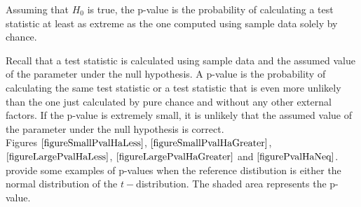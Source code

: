 \begin{definition}[P-value]\label{definitionPValue}	
Assuming that $H_{0}$ is true, the p-value is the probability of calculating a test statistic at least as extreme as the one computed using sample data solely by chance.
\end{definition}

Recall that a test statistic is calculated using sample data and the assumed value of the parameter under the null hypothesis. A p-value is the probability of calculating the same test statistic or a test statistic that is even more unlikely than the one just calculated by pure chance and without any other external factors. If the p-value is extremely small, it is unlikely that the assumed value of the parameter under the null hypothesis is correct.\\

Figures $\ref{figureSmallPvalHaLess}$,
$\ref{figureSmallPvalHaGreater}$,
$\ref{figureLargePvalHaLess}$,
$\ref{figureLargePvalHaGreater}$
and
$\ref{figurePvalHaNeq}$.
provide some examples of p-values when the reference distibution
is either the normal distribution of the $t-$distribution.
The shaded area represents the p-value.

